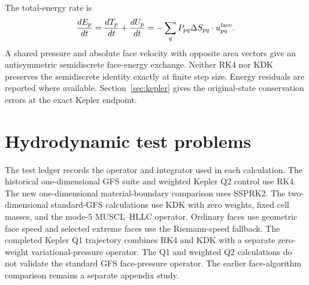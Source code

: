 \documentclass[twocolumn]{aastex63}
\newcommand{\vel}{{u}}
\newcommand{\surf}[0]{S}
\begin{document}
The total-energy rate is
\begin{equation}\label{eq:dEface}
  {dE_p\over dt}
  ={dT_p\over dt}+{dU_p\over dt}
  =-\sum_qP_{pq}\Delta\surf_{pq}\cdot\vel_{pq}^{\rm face}.
\end{equation}
A shared pressure and absolute face velocity with opposite area vectors give
an antisymmetric semidiscrete face-energy exchange. Neither RK4 nor KDK
preserves the semidiscrete identity exactly at finite step size. Energy
residuals are reported where available. Section~\ref{sec:kepler} gives
the original-state conservation errors at the exact Kepler endpoint.

\section{Hydrodynamic test problems}
The test ledger records the operator and integrator used in each calculation.
The historical one-dimensional GFS suite and weighted Kepler Q2 control
use RK4. The new one-dimensional material-boundary comparison uses SSPRK2.
The two-dimensional standard-GFS calculations use KDK with zero weights,
fixed cell masses, and the mode-5 MUSCL--HLLC operator. Ordinary faces
use geometric face speed and selected extreme faces use the Riemann-speed
fallback. The completed Kepler Q1 trajectory combines RK4 and KDK with
a separate zero-weight variational-pressure operator.
The Q1 and weighted Q2 calculations do not validate the standard GFS
face-pressure operator. The earlier face-algorithm comparison remains
a separate appendix study.
\end{document}
